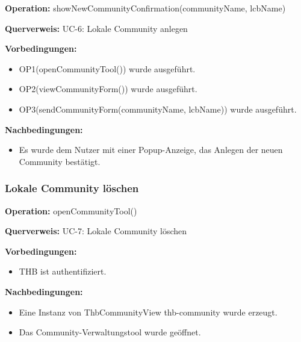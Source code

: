 \documentclass[a4paper,12pt]{article}
\begin{document}
	\begin{contractbox}
		\textbf{Operation:} showNewCommunityConfirmation(communityName, lcbName)
		
			\textbf{Querverweis:} UC-6: Lokale Community anlegen
		
		\textbf{Vorbedingungen:}
		\begin{itemize}[noitemsep]
			\item OP1(openCommunityTool()) wurde ausgeführt.
			\item OP2(viewCommunityForm()) wurde ausgeführt.
			\item OP3(sendCommunityForm(communityName, lcbName)) wurde ausgeführt.
		\end{itemize}
		
		\textbf{Nachbedingungen:}
		\begin{itemize}[noitemsep]
			\item Es wurde dem Nutzer mit einer Popup-Anzeige, das Anlegen der neuen Community bestätigt.
		\end{itemize}
	\end{contractbox}

	\subsubsection{Lokale Community löschen}
	\begin{contractbox}
		\textbf{Operation:} openCommunityTool()
		
			\textbf{Querverweis:} UC-7: Lokale Community löschen
		
		\textbf{Vorbedingungen:}
		\begin{itemize}[noitemsep]
			\item THB ist authentifiziert.
		\end{itemize}
		
		\textbf{Nachbedingungen:}
		\begin{itemize}[noitemsep]
			\item Eine Instanz von ThbCommunityView thb-community wurde erzeugt.
			\item Das Community-Verwaltungstool wurde geöffnet.
		\end{itemize}
	\end{contractbox}
\end{document}
